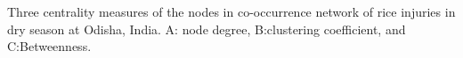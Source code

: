 Three centrality measures of the nodes in co-occurrence network of rice injuries in dry season at Odisha, India. A: node degree, B:clustering coefficient, and C:Betweenness.
\label{fig:nodepropOR_ds}
